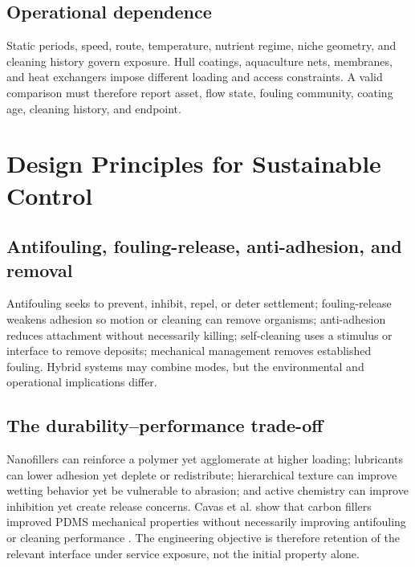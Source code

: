 \subsection{Operational dependence}
Static periods, speed, route, temperature, nutrient regime, niche geometry, and cleaning history govern exposure. Hull coatings, aquaculture nets, membranes, and heat exchangers impose different loading and access constraints. A valid comparison must therefore report asset, flow state, fouling community, coating age, cleaning history, and endpoint.

\section{Design Principles for Sustainable Control}
\subsection{Antifouling, fouling-release, anti-adhesion, and removal}
Antifouling seeks to prevent, inhibit, repel, or deter settlement; fouling-release weakens adhesion so motion or cleaning can remove organisms; anti-adhesion reduces attachment without necessarily killing; self-cleaning uses a stimulus or interface to remove deposits; mechanical management removes established fouling. Hybrid systems may combine modes, but the environmental and operational implications differ.

\subsection{The durability--performance trade-off}
Nanofillers can reinforce a polymer yet agglomerate at higher loading; lubricants can lower adhesion yet deplete or redistribute; hierarchical texture can improve wetting behavior yet be vulnerable to abrasion; and active chemistry can improve inhibition yet create release concerns. Cavas et al. show that carbon fillers improved PDMS mechanical properties without necessarily improving antifouling or cleaning performance \cite{cavas_reinforcement_2018}. The engineering objective is therefore retention of the relevant interface under service exposure, not the initial property alone.
